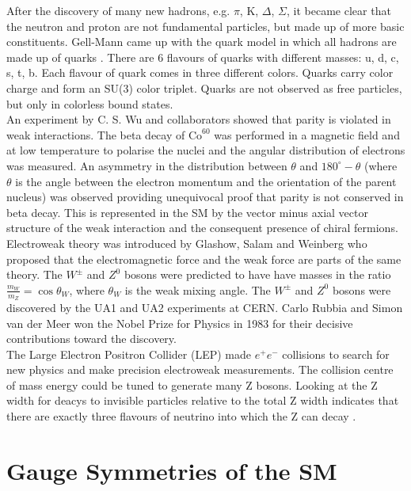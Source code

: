After the discovery of many new hadrons, e.g. $\pi$, K, $\Delta$, $\Sigma$, it
became clear that the neutron and proton are not fundamental particles, but made
up of more basic constituents. Gell-Mann came up with the quark model in which 
all hadrons are made up of quarks \cite{gellmann}. There are 6 flavours of 
quarks with different masses: u, d, c, s, t, b. Each flavour of quark comes in 
three different colors. Quarks carry color charge and form an SU(3) color 
triplet. Quarks are not observed as free particles, but only in colorless bound 
states. \\

An experiment by C. S. Wu and collaborators \cite{wu} showed that parity is 
violated in weak interactions. The beta decay of $\mbox{Co}^{60}$ was performed 
in a magnetic field and at low temperature to polarise the nuclei and the 
angular distribution of electrons was measured. An asymmetry in the distribution 
between $\theta$ and $180^{\circ} - \theta$ (where $\theta$ is the angle between 
the electron momentum and the orientation of the parent nucleus) was observed
providing unequivocal proof that parity is not conserved in beta decay. This is
represented in the SM by the vector minus axial vector structure of the weak 
interaction and the consequent presence of chiral fermions. \\

Electroweak theory was introduced by Glashow, Salam and Weinberg \cite{salam,
weinberg} who proposed that the electromagnetic force and the weak force are 
parts of the same theory. The $W^{\pm}$ and $Z^{0}$ bosons were predicted to 
have have masses in the ratio $\frac{m_{W}}{m_{Z}} = \cos{\theta_{W}}$, where 
$\theta_{W}$ is the weak mixing angle. The $W^{\pm}$ and $Z^{0}$ bosons were 
discovered by the UA1 and UA2 experiments \cite{ua1} at CERN. Carlo Rubbia and 
Simon van der Meer won the Nobel Prize for Physics in 1983 for their decisive 
contributions toward the discovery. \\

The Large Electron Positron Collider (LEP) \cite{lep} made $e^{+}e^{-}$ 
collisions to search for new physics and make precision electroweak 
measurements. The collision centre of mass energy could be tuned to generate
many Z bosons. Looking at the Z width for deacys to invisible particles relative 
to the total Z width indicates that there are exactly three flavours of neutrino 
into which the Z can decay \cite{3nu}. 

\section{Gauge Symmetries of the SM}

